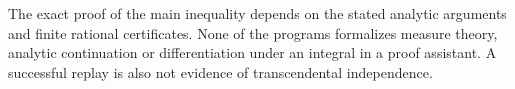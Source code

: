 The exact proof of the main inequality depends on the stated analytic arguments and finite rational certificates. None of the programs formalizes measure theory, analytic continuation or differentiation under an integral in a proof assistant. A successful replay is also not evidence of transcendental independence.
